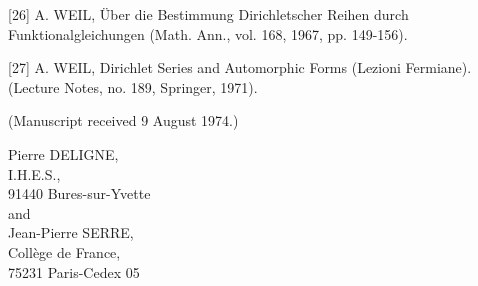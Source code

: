 \documentclass[10pt,oneside]{article}
\newenvironment{DLineBlock}{\par\smallskip\begin{center}\begin{minipage}{0.76\textwidth}\raggedright}{\end{minipage}\end{center}\smallskip}
\begin{document}
[26] A. WEIL, Über die Bestimmung Dirichletscher Reihen durch Funktionalgleichungen (Math. Ann., vol. 168, 1967, pp. 149-156).\par

[27] A. WEIL, Dirichlet Series and Automorphic Forms (Lezioni Fermiane). (Lecture Notes, no. 189, Springer, 1971).\par

(Manuscript received 9 August 1974.)\par

\begin{DLineBlock}
Pierre DELIGNE, \\
I.H.E.S., \\
91440 Bures-sur-Yvette \\
and \\
Jean-Pierre SERRE, \\
Collège de France, \\
75231 Paris-Cedex 05
\end{DLineBlock}
\end{document}
